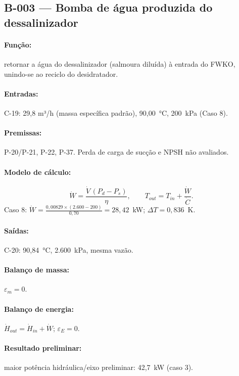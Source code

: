 \documentclass[11pt,a4paper]{article}
\numberwithin{equation}{section}
\numberwithin{table}{section}
\numberwithin{figure}{section}
\begin{document}
\subsection{B-003 --- Bomba de água produzida do dessalinizador}
\paragraph{Função:} retornar a água do dessalinizador (salmoura diluída) à entrada do FWKO, unindo-se ao reciclo do desidratador.
\paragraph{Entradas:} C-19: 29,8 m³/h (massa específica padrão), 90,00~\si{\celsius}, 200~\si{\kilo\pascal} (Caso 8).
\paragraph{Premissas:} P-20/P-21, P-22, P-37. Perda de carga de sucção e NPSH não avaliados.
\paragraph{Modelo de cálculo:}
\begin{equation}
\dot W=\frac{\dot V\,(P_{d}-P_{s})}{\eta},\qquad T_{out}=T_{in}+\frac{\dot W}{\dot C}.
\end{equation}
Caso 8: $\dot W=\frac{0{,}00829\times(2.600-200)}{0{,}70}=28{,}42$~\si{\kilo\watt}; $\Delta T=0{,}836$~\si{\kelvin}.

\paragraph{Saídas:} C-20: 90,84~\si{\celsius}, 2.600~\si{\kilo\pascal}, mesma vazão.
\paragraph{Balanço de massa:} $\varepsilon_m=$$0$.
\paragraph{Balanço de energia:} $\dot H_{out}=\dot H_{in}+\dot W$; $\varepsilon_E=$$0$.
\paragraph{Resultado preliminar:} maior potência hidráulica/eixo preliminar: 42,7~\si{\kilo\watt} (caso 3).
\end{document}

